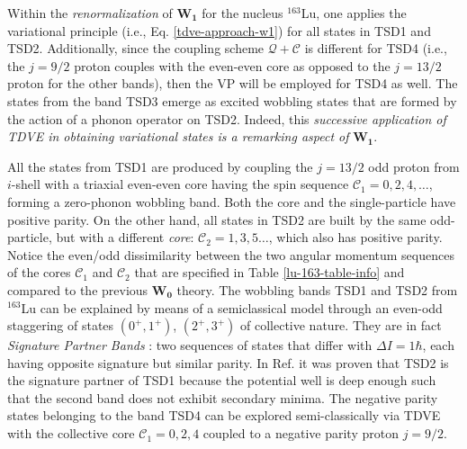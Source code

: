 Within the \emph{renormalization} of $\mathbf{W_1}$ for the nucleus $^{163}$Lu, one applies the variational principle (i.e., Eq. \ref{tdve-approach-w1}) for all states in TSD1 and TSD2. Additionally, since the coupling scheme $\mathcal{Q}+\mathscr{C}$ is different for TSD4 (i.e., the $j=9/2$ proton couples with the even-even core as opposed to the $j=13/2$ proton for the other bands), then the VP will be employed for TSD4 as well. The states from the band TSD3 emerge as excited wobbling states that are formed by the action of a phonon operator on TSD2. Indeed, this \emph{successive application of TDVE in obtaining variational states is a remarking aspect of} $\mathbf{W_1}$.

All the states from TSD1 are produced by coupling the $j=13/2$ odd proton from $i$-shell with a triaxial even-even core having the spin sequence $\mathscr{C}_1=0,2,4,\dots$, forming a zero-phonon wobbling band. Both the core and the single-particle have positive parity. On the other hand, all states in TSD2 are built by the same odd-particle, but with a different \emph{core}: $\mathscr{C}_2=1,3,5\dots$, which also has positive parity. Notice the even/odd dissimilarity between the two angular momentum sequences of the cores $\mathscr{C}_1$ and $\mathscr{C}_2$ that are specified in Table \ref{lu-163-table-info} and compared to the previous $\mathbf{W_0}$ theory. The wobbling bands TSD1 and TSD2 from $^{163}$Lu can be explained by means of a semiclassical model through an even-odd staggering of states $(0^+,1^+)$, $(2^+,3^+)$ of collective nature. They are in fact \emph{Signature Partner Bands} \cite{raduta2020approach}: two sequences of states that differ with $\Delta I=1\hbar$, each having opposite signature but similar parity. In Ref. \cite{raduta2020towards} it was proven that TSD2 is the signature partner of TSD1 because the potential well is deep enough such that the second band does not exhibit secondary minima. The negative parity states belonging to the band TSD4 can be explored semi-classically via TDVE with the collective core $\mathscr{C}_1=0,2,4$ coupled to a negative parity proton $j=9/2$.

